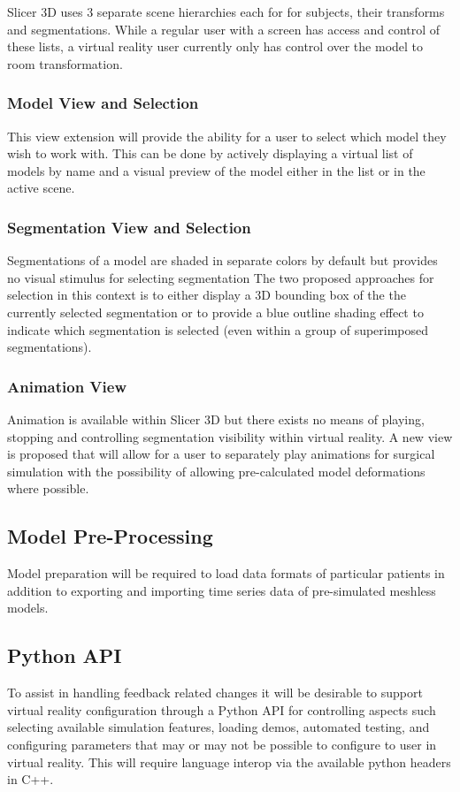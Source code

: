 Slicer 3D uses 3 separate scene hierarchies each for for subjects, their transforms and segmentations. While a regular user with a screen has access and control of these lists, a virtual reality user currently only has control over the model to room transformation.

\subsubsection{Model View and Selection}
This view extension will provide the ability for a user to select which model they wish to work with. This can be done by actively displaying a virtual list of models by name and a visual preview of the model either in the list or in the active scene. 

\subsubsection{Segmentation View and Selection}
Segmentations of a model are shaded in separate colors by default but provides no visual stimulus for selecting segmentation The two proposed approaches for selection in this context is to either display a 3D bounding box of the the currently selected segmentation or to provide a blue outline shading effect to indicate which segmentation is selected (even within a group of superimposed segmentations).

\subsubsection{Animation View}
Animation is available within Slicer 3D but there exists no means of playing, stopping and controlling segmentation visibility within virtual reality. A new view is proposed that will allow for a user to separately play animations for surgical simulation with the possibility of allowing pre-calculated model deformations where possible.

\subsection{Model Pre-Processing}
Model preparation will be required to load data formats of particular patients in addition to exporting and importing time series data of pre-simulated meshless models.

\subsection{Python API}
To assist in handling feedback related changes it will be desirable to support virtual reality configuration through a Python API for controlling aspects such selecting available simulation features, loading demos, automated testing, and configuring parameters that may or may not be possible to configure to user in virtual reality. This will require language interop via the available python headers in C++.

